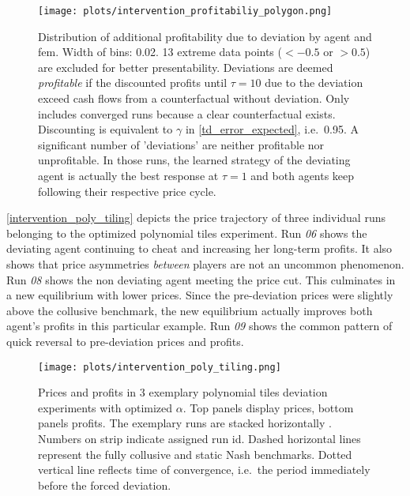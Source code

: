 \begin{figure}
	\texttt{[image: plots/intervention\_profitabiliy\_polygon.png]}
	\caption[Distribution of additional profitability due to deviation by agent and \gls{fem}]{Distribution of additional profitability due to deviation by agent and \gls{fem}. Width of bins: 0.02. 13 extreme data points ($<-0.5$ or $>0.5$) are excluded for better presentability. Deviations are deemed \emph{profitable} if the discounted profits until $\tau = 10$ due to the deviation exceed cash flows from a counterfactual without deviation. Only includes converged runs because a clear counterfactual exists. Discounting is equivalent to $\gamma$ in \autoref{td_error_expected}, i.e.\ 0.95. A significant number of 'deviations' are neither profitable nor unprofitable. In those runs, the learned strategy of the deviating agent is actually the best response at $\tau = 1$ and both agents keep following their respective price cycle.}
	\label{intervention_profitability_polygon}
\end{figure}


\autoref{intervention_poly_tiling} depicts the price trajectory of three individual runs belonging to the optimized polynomial tiles experiment. Run \emph{06} shows the deviating agent continuing to cheat and increasing her long-term profits. It also shows that price asymmetries \emph{between} players are not an uncommon phenomenon. Run \emph{08} shows the non deviating agent meeting the price cut. This culminates in a new equilibrium with lower prices. Since the pre-deviation prices were slightly above the collusive benchmark, the new equilibrium actually improves both agent's profits in this particular example. Run \emph{09} shows the common pattern of quick reversal to pre-deviation prices and profits.

\begin{figure}
	\texttt{[image: plots/intervention\_poly\_tiling.png]}
	\caption[Prices and profits in polynomial tiles deviation experiment]{Prices and profits in 3 exemplary polynomial tiles deviation experiments with optimized $\alpha$. Top panels display prices, bottom panels profits. The exemplary runs are stacked horizontally	. Numbers on strip indicate assigned run id. Dashed horizontal lines represent the fully collusive and static Nash benchmarks. Dotted vertical line reflects time of convergence, i.e.\ the period immediately before the forced deviation.}
	\label{intervention_poly_tiling}
\end{figure}